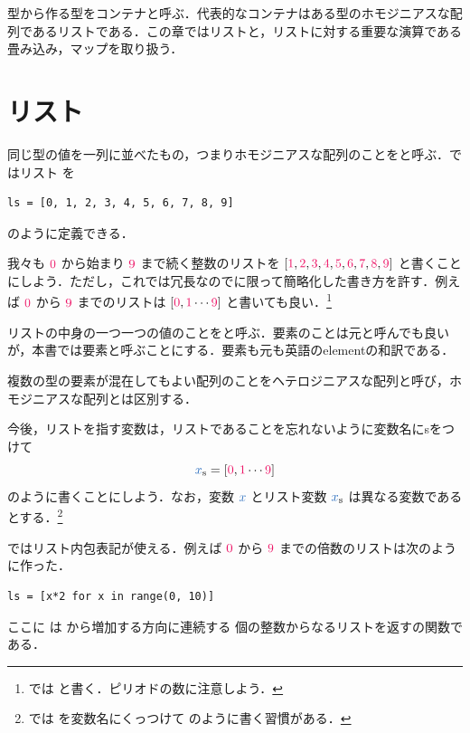 \documentclass[a5paper,twoside,fleqn,draft]{jsbook}
\begin{document}
\begin{leader}
型から作る型をコンテナと呼ぶ．代表的なコンテナはある型のホモジニアスな配列であるリストである．この章ではリストと，リストに対する重要な演算である畳み込み，マップを取り扱う．
\end{leader}

\section{リスト}

同じ型の値を一列に並べたもの，つまりホモジニアスな配列のことをと呼ぶ．\python ではリスト  を
\begin{pythoncode}
\begin{verbatim}
ls = [0, 1, 2, 3, 4, 5, 6, 7, 8, 9]
\end{verbatim}
\end{pythoncode}
のように定義できる．

我々も $\hConstant{0}$ から始まり $\mNineNumber$ まで続く整数のリストを $[\hConstant{1},\mTwoNumber,\mThreeNumber,\mFourNumber,\mFiveNumber,\mSixNumber,\mSevenNumber,\mEightNumber,\mNineNumber]$ と書くことにしよう．ただし，これでは冗長なのでに限って簡略化した書き方を許す．例えば $\hConstant{0}$ から $\mNineNumber$ までのリストは $[\hConstant{0},\hConstant{1}\dotsb\mNineNumber]$ と書いても良い．\footnote{\haskell では \code{[0, 1..9]} と書く．ピリオドの数に注意しよう．}

リストの中身の一つ一つの値のことをと呼ぶ．要素のことは元と呼んでも良いが，本書では要素と呼ぶことにする．要素も元も英語のelementの和訳である．

複数の型の要素が混在してもよい配列のことをヘテロジニアスな配列と呼び，ホモジニアスな配列とは区別する．

今後，リストを指す変数は，リストであることを忘れないように変数名にsをつけて
\begin{equation}
  \mList{x}
  =[\hConstant{0},\hConstant{1}\dotsb\mNineNumber]
\end{equation}
のように書くことにしよう．なお，変数 $\hVar{x}$ とリスト変数 $\mList{x}$ は異なる変数であるとする．\footnote{\haskell では  を変数名にくっつけて  のように書く習慣がある．}

\separator

\python ではリスト内包表記が使える．例えば $\hConstant{0}$ から $\mNineNumber$ までの倍数のリストは次のように作った．
\begin{pythoncode}
\begin{verbatim}
ls = [x*2 for x in range(0, 10)]
\end{verbatim}
\end{pythoncode}
ここに  は  から増加する方向に連続する  個の整数からなるリストを返す\python の関数である．
\end{document}
